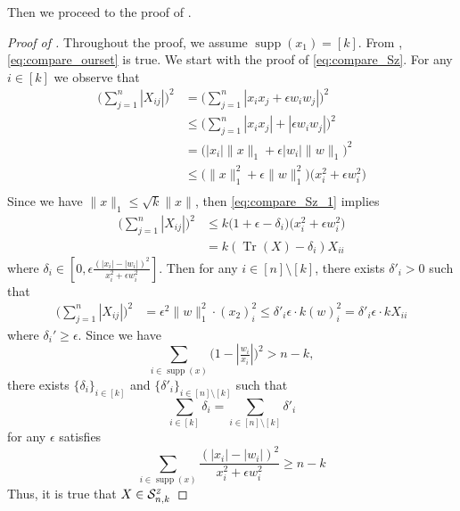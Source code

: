 \documentclass[11pt]{amsart}
\newcommand{\Sz}[2]{\ensuremath{\mathcal{S}_{#1,#2}^{\textit{\tiny{Z}}}}}
\theoremstyle{plain}
\theoremstyle{definition}
\theoremstyle{remark}
\DeclareMathOperator{\tr}{Tr}
\DeclareMathOperator{\supp}{supp}
\begin{document}
\begin{appendices}
		Then we proceed to the proof of .
		\begin{proof}[Proof of ]
			Throughout the proof, we assume \( \supp(x_1) = [k]\). From , \eqref{eq:compare_ourset} is true. We start with the proof of \eqref{eq:compare_Sz}. For any \(i \in [k]\) we observe that
			\begin{equation}\label{eq:compare_Sz_1}
				\begin{split}
					\Big(\sum_{j=1}^n|X_{ij}|\Big)^2 &=  \Big(\sum_{j=1}^n|x_ix_j + \epsilon w_iw_j|\Big)^2\\
					&\leq \Big(\sum_{j=1}^n|x_ix_j| + |\epsilon w_iw_j|\Big)^2\\
					&=\Big(|x_i|\|x\|_1+\epsilon|w_i|\|w\|_1\Big)^2 \\
					&\leq  \big(\|x\|_1^2 + \epsilon\|w\|_1^2\big) \big(x_i^2 + \epsilon w_i^2 \big)\\
				\end{split}
			\end{equation}
			Since we have \(\|x\|_1 \leq \sqrt{k}\|x\|\),  then \eqref{eq:compare_Sz_1} implies 
			\begin{equation}
				\begin{split}
					\Big(\sum_{j=1}^n|X_{ij}|\Big)^2 &\leq  k \big(1 + \epsilon - \delta_i\big) \big(x_i^2 + \epsilon w_i^2 \big)\\
					&= k (\tr(X)-\delta_i) X_{ii}
				\end{split}
			\end{equation}
             where \(\delta_i \in [0, \epsilon\tfrac{(|x_i| - |w_i|)^2}{x_i^2 + \epsilon w_i^2}]\). Then for any \(i \in [n]\setminus [k]\), there exists \(\delta'_i>0\) such that 
			\begin{equation}
				\begin{split}
					\Big(\sum_{j=1}^n|X_{ij}|\Big)^2 & =   \epsilon^2\|w\|_1^2\cdot(x_2)_i^2 \leq \delta'_i \epsilon \cdot k (w)_i^2 = \delta'_i \epsilon \cdot k X_{ii}
				\end{split}
			\end{equation}
            where \(\delta_i'\geq \epsilon\). Since we have 
            \[
            \sum_{i\in\supp(x)}\big(1-|\tfrac{w_i}{x_i}|\big)^2>n-k,
            \]
            there exists \(\{\delta_i\}_{i\in[k]}\) and \(\{\delta'_i\}_{i\in[n]\setminus[k]}\) such that
			\begin{equation}
				\sum_{i\in [k]} \delta_i = \sum_{i\in [n]\setminus [k]} \delta'_i
			\end{equation}
			for any \(\epsilon\) satisfies
            \[
            \sum_{i\in\supp(x)} \frac{(|x_i| - |w_i|)^2}{x_i^2 + \epsilon w_i^2} \geq n - k
            \]
            Thus, it is true that \(X \in \Sz{n}{k}\) 
		\end{proof}
		
	\end{appendices}
	
	
	
\end{document}
